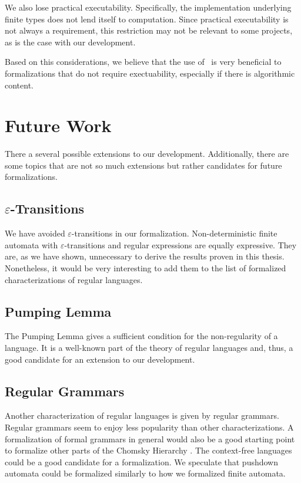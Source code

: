 We also lose practical executability. 
Specifically, the implementation underlying finite types does not lend itself to computation. 
Since practical executability is not always a requirement, this restriction may not be relevant to some projects, as is the case with our development.

Based on this considerations, we believe that the use of \ssreflect\ is very beneficial to formalizations that do not require exectuability, especially if there is algorithmic content. 



\section{Future Work}
There a several possible extensions to our development.
Additionally, there are some topics that are not so much extensions but rather candidates for future formalizations.

\subsection[$\varepsilon$-Transitions]{\texorpdfstring{$\varepsilon$-Transitions}{Epsilon-Transitions}}
We have avoided $\varepsilon$-transitions in our formalization. 
Non-deterministic finite automata with $\varepsilon$-transitions and regular expressions are equally expressive.
They are, as we have shown, unnecessary to derive the results proven in this thesis.
Nonetheless, it would be very interesting to add them to the list of formalized characterizations of regular languages.

\subsection{Pumping Lemma}
The Pumping Lemma \cite{BarHillelPerlesShamir61Formal} gives a sufficient condition for the non-regularity of a language. 
It is a well-known part of the theory of regular languages and, thus, a good candidate for an extension to our development.

\subsection{Regular Grammars}
Another characterization of regular languages is given by regular grammars.
Regular grammars seem to enjoy less popularity than other characterizations.
A formalization of formal grammars in general would also be a good starting point to formalize other parts of the
Chomsky Hierarchy \cite{Chomsky1956}. 
The context-free languages could be a good candidate for a formalization.
We speculate that pushdown automata could be formalized similarly to how we formalized finite automata.


